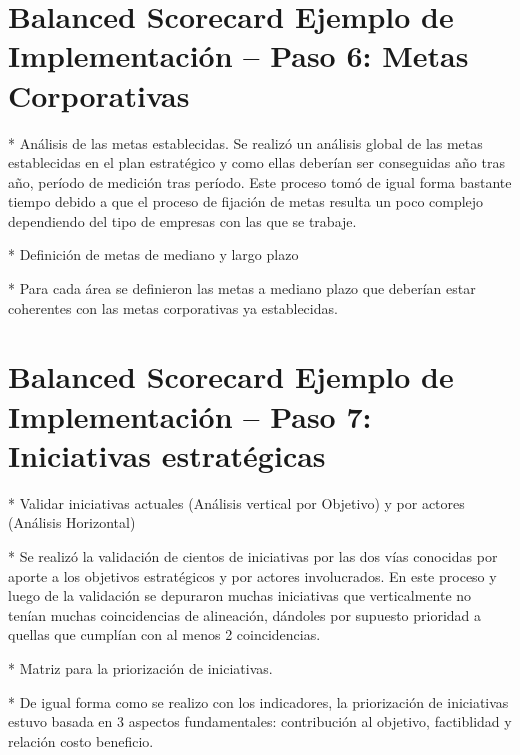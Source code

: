 \section{Balanced Scorecard Ejemplo de Implementación – Paso 6: Metas Corporativas}
\item {* Análisis de las metas establecidas. Se realizó un análisis global de las metas establecidas en el plan estratégico y como ellas deberían ser conseguidas año tras año, período de medición tras período.  Este proceso tomó de igual forma bastante tiempo debido a que el proceso de fijación de metas resulta un poco complejo dependiendo del tipo de empresas con las que se trabaje.

* Definición de  metas de mediano y largo plazo

* Para cada área se definieron las metas a mediano plazo que deberían estar coherentes con las metas corporativas ya establecidas.}

\section{Balanced Scorecard Ejemplo de Implementación – Paso 7: Iniciativas estratégicas}
\item {* Validar iniciativas actuales  (Análisis vertical por Objetivo) y por actores (Análisis Horizontal)

* Se realizó la validación de cientos de iniciativas por las dos vías conocidas por aporte a los objetivos estratégicos y por actores involucrados. En este proceso y luego de la validación se depuraron muchas iniciativas que verticalmente no tenían muchas coincidencias de alineación, dándoles por supuesto prioridad a quellas que cumplían con al menos 2 coincidencias.

* Matriz para la priorización de iniciativas.

* De igual forma como se realizo con los indicadores, la priorización de iniciativas estuvo basada en 3 aspectos fundamentales: contribución al objetivo, factiblidad y relación costo beneficio.}


